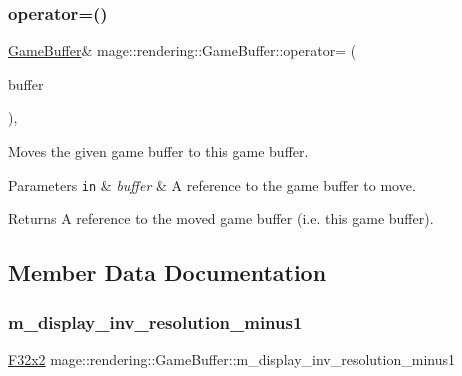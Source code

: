 \subsubsection{\texorpdfstring{operator=()}{operator=()}\hspace{0.1cm}{\footnotesize\ttfamily [2/2]}}
{\footnotesize\ttfamily \hyperlink{structmage_1_1rendering_1_1_game_buffer}{Game\+Buffer}\& mage\+::rendering\+::\+Game\+Buffer\+::operator= (\begin{DoxyParamCaption}\item[{\hyperlink{structmage_1_1rendering_1_1_game_buffer}{Game\+Buffer} \&\&}]{buffer }\end{DoxyParamCaption})\hspace{0.3cm}{\ttfamily [default]}, {\ttfamily [noexcept]}}

Moves the given game buffer to this game buffer.


\begin{DoxyParams}[1]{Parameters}
\mbox{\tt in}  & {\em buffer} & A reference to the game buffer to move. \\
\hline
\end{DoxyParams}
\begin{DoxyReturn}{Returns}
A reference to the moved game buffer (i.\+e. this game buffer). 
\end{DoxyReturn}


\subsection{Member Data Documentation}
\hypertarget{structmage_1_1rendering_1_1_game_buffer_a046916a46d80f979ac4f16c2ba58d8ef}{}\label{structmage_1_1rendering_1_1_game_buffer_a046916a46d80f979ac4f16c2ba58d8ef} 
\subsubsection{\texorpdfstring{m\+\_\+display\+\_\+inv\+\_\+resolution\+\_\+minus1}{m\_display\_inv\_resolution\_minus1}}
{\footnotesize\ttfamily \hyperlink{namespacemage_aa87237ad091f5cd7da612b8523fc108f}{F32x2} mage\+::rendering\+::\+Game\+Buffer\+::m\+\_\+display\+\_\+inv\+\_\+resolution\+\_\+minus1}

